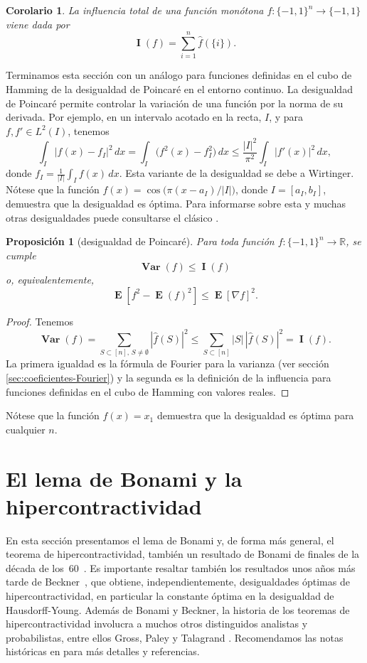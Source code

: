 \documentclass[autocontact]{gaceta}
\newcommand{\R}{\mathbb{R}}
\newtheorem{corollary}{Corolario}
\newtheorem{proposition}{Proposición}
\DeclareMathOperator{\Var}{\mathbf{Var}}
\DeclareMathOperator{\II}{\mathbf{I}}
\DeclareMathOperator{\EE}{\mathbf{E}}
\begin{document}
\begin{corollary}
La influencia total de una función monótona $f:\{-1,1\}^n\to \{-1,1\}$ viene dada por
\[
\II(f) = \sum_{i=1}^n \widehat{f}(\{i\}).
\]
\end{corollary}

Terminamos esta sección con un análogo para funciones definidas en el cubo de Hamming de la desigualdad de Poincaré en el entorno continuo. La desigualdad de Poincaré permite controlar la variación de una función por la norma de su derivada. Por ejemplo, en un intervalo acotado en la recta, $I$, y para $f,f' \in L^2(I)$, tenemos
\[
   \int_I |f(x)-f_I|^2 \, dx
   = \int_I \big(f^2(x)-f_I^2\big) \, dx
   \leq \frac{|I|^2}{\pi^2} \int_I |f'(x)|^2 \, dx,
\]
donde $f_I=\frac{1}{|I|} \int_I f(x)\,dx$. Esta variante de la desigualdad se debe a Wirtinger. Nótese que la función $f(x)=\cos \big(\pi (x-a_I)/|I|\big)$, donde $I=[a_I,b_I]$, demuestra que la desigualdad es óptima. Para informarse sobre esta y muchas otras desigualdades puede consultarse el clásico \cite[sección 7.7]{HLP23}.

\begin{proposition}[desigualdad de Poincaré]
\label{thm:Poincare's Inequality}
Para toda función $f:\{-1,1\}^n \to \R$, se cumple
\[
   \Var(f) \leq \II(f)
\]
o, equivalentemente,
\[
   \EE[f^2-\EE(f)^2]\leq \EE[\nabla f]^2.
\]
\end{proposition}

\begin{proof} Tenemos
\[
   \Var(f) = \sum_{S\subset [n],\, S\neq \emptyset} |\widehat{f}(S)|^2
   \leq \sum_{S\subset [n]} |S|\, |\widehat{f}(S)|^2 = \II(f).
\]
La primera igualdad es la fórmula de Fourier para la varianza (ver sección \ref{sec:coeficientes-Fourier}) y la segunda es la definición de la influencia para funciones definidas en el cubo de Hamming con valores reales.
\end{proof}

Nótese que la función $f(x)=x_1$ demuestra que la desigualdad es óptima para cualquier $n$.

\section{El lema de Bonami y la hipercontractividad}\label{sec:Bonami}

En esta sección presentamos el lema de Bonami y, de forma más general, el teorema de hipercontractividad, también un resultado de Bonami de finales de la década de los~60~\cite{Bon68, Bon70}. Es importante resaltar también los resultados unos años más tarde de Beckner~\cite{Bec75}, que obtiene, independientemente, desigualdades óptimas de hipercontractividad, en particular la constante óptima en la desigualdad de Hausdorff-Young. Además de Bonami y Beckner, la historia de los teoremas de hipercontractividad involucra a muchos otros distinguidos analistas y probabilistas, entre ellos Gross, Paley y Talagrand \cite{Gro75,Pal32,Tal93}. Recomendamos las notas históricas en \cite[pp. 278--281]{O'Do21} para más detalles y referencias.
\end{document}
